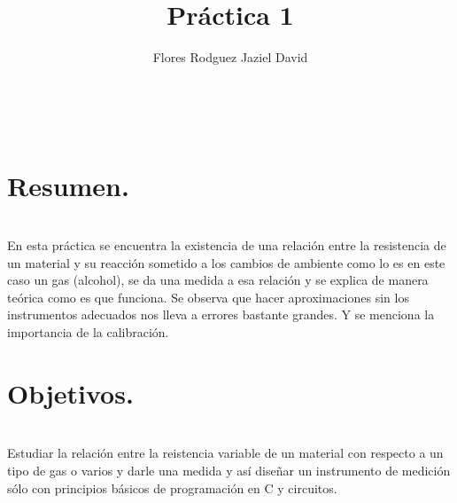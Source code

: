 \documentclass[11pt,a4paper]{article}
\author{Flores Rodguez Jaziel David }
\title{Pr\'{a}ctica 1}
\begin{document}
\tableofcontents
\\
\medskip
\medskip
\section{Resumen.}
\\
En esta pr\'{a}ctica se encuentra la existencia de una relaci\'{o}n entre la resistencia de un material y su reacci\'{o}n sometido a los cambios de ambiente como lo es en este caso un gas (alcohol), se da una medida a esa relaci\'{o}n y se explica de manera te\'{o}rica como es que funciona. Se observa que hacer aproximaciones sin los instrumentos adecuados nos lleva a errores bastante grandes. Y se menciona la importancia de la calibraci\'{o}n. \\
\medskip


\section{Objetivos.}\\
Estudiar la relaci\'{o}n entre la reistencia variable de un material con respecto a un tipo de gas o varios y darle una medida y as\'{i} dise\~{n}ar un instrumento de medici\'{o}n s\'{o}lo con principios b\'{a}sicos de programaci\'{o}n en C y circuitos.
 
\\
\pagebreak
\end{document}
